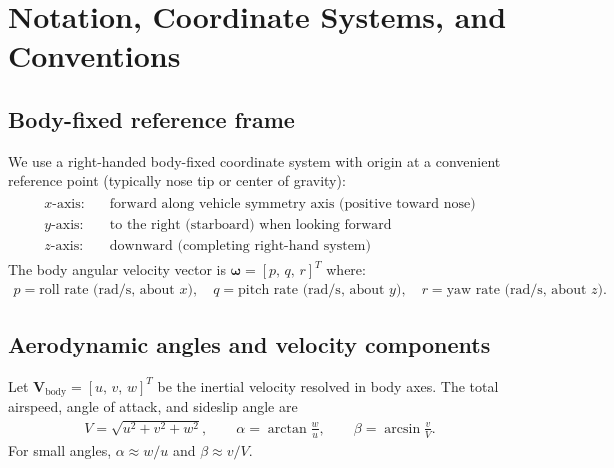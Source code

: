 \documentclass[11pt]{article}
\begin{document}
\section{Notation, Coordinate Systems, and Conventions}

\subsection{Body-fixed reference frame}
We use a right-handed body-fixed coordinate system with origin at a convenient reference point (typically nose tip or center of gravity):
\begin{align}
\begin{aligned}
x\text{-axis:} &\quad \text{forward along vehicle symmetry axis (positive toward nose)}\\
y\text{-axis:} &\quad \text{to the right (starboard) when looking forward}\\
z\text{-axis:} &\quad \text{downward (completing right-hand system)}
\end{aligned}
\end{align}
The body angular velocity vector is $\bm{\omega}=[p,\,q,\,r]^T$ where:
\begin{align}
p = \text{roll rate (rad/s, about $x$)},\quad
q = \text{pitch rate (rad/s, about $y$)},\quad
r = \text{yaw rate (rad/s, about $z$)}.
\end{align}

\subsection{Aerodynamic angles and velocity components}
Let $\mathbf{V}_{\text{body}}=[u,\,v,\,w]^T$ be the inertial velocity resolved in body axes. The total airspeed, angle of attack, and sideslip angle are
\begin{align}
V = \sqrt{u^2+v^2+w^2},\qquad
\alpha = \arctan\frac{w}{u},\qquad
\beta = \arcsin\frac{v}{V}.
\end{align}
For small angles, $\alpha \approx w/u$ and $\beta \approx v/V$.
\end{document}
